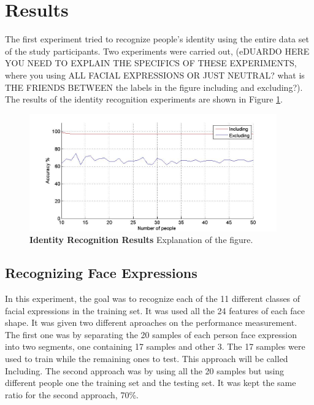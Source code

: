\documentclass[]{article}
\begin{document}
\section{Results}
The first experiment tried to recognize people's identity using the entire data set of the study participants. Two
experiments were carried out, (eDUARDO HERE YOU NEED TO EXPLAIN THE SPECIFICS OF THESE EXPERIMENTS, where you using ALL
FACIAL EXPRESSIONS OR JUST NEUTRAL? what is THE FRIENDS BETWEEN the labels in the figure including and excluding?). The
results of the identity recognition experiments are shown in Figure \ref{identityRecognition}.

\begin{figure}[ht]
\begin{center}
\vspace{-3mm}
\includegraphics[width=0.95\textwidth]{figures/figureRecognizeFacialExpression.jpg}
\end{center}
\caption{\textbf{Identity Recognition Results} Explanation of the figure.}
\label{identityRecognition}
\end{figure}

\subsection{Recognizing Face Expressions}

In this experiment, the goal was to recognize each of the 11 different classes of facial expressions in the training
set. It was used all the 24 features of each face shape. It was
 given two different aproaches on the performance measurement. The first one was by separating the 20 samples of each
 person face expression into two segments, one containing 17 samples and other 3. The 17 samples were used to train
 while the remaining ones to test. This approach will be called Including. The second approach was by using all the 20
 samples but using different people one the training set and the testing set. It was kept the same ratio for the second
 approach, 70\%.
 
\end{document}
